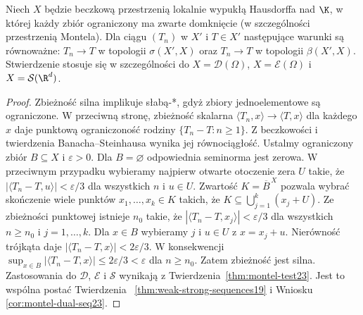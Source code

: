 \begin{twierdzenie}
\label{thm:weak-strong-sequences25}
Niech $X$ będzie beczkową przestrzenią lokalnie wypukłą
Hausdorffa nad $\K$, w której każdy zbiór ograniczony
ma zwarte domknięcie (w szczególności przestrzenią Montela).
Dla ciągu $(T_n)$ w $X'$ i $T\in X'$ następujące
warunki są równoważne: $T_n\to T$ w topologii
$\sigma(X',X)$ oraz $T_n\to T$ w topologii $\beta(X',X)$.
Stwierdzenie stosuje się w szczególności do
$X=\mathcal D(\Omega)$, $X=\mathcal E(\Omega)$ i
$X=\mathcal S(\R^d)$.
\end{twierdzenie}
\begin{proof}
Zbieżność silna implikuje słabą-*, gdyż zbiory
jednoelementowe są ograniczone. W przeciwną stronę,
zbieżność skalarna $\langle T_n,x\rangle\to\langle T,x\rangle$
dla każdego $x$ daje punktową ograniczoność rodziny
$\{T_n-T:n\ge1\}$. Z beczkowości i twierdzenia
Banacha--Steinhausa wynika jej równociągłość.
Ustalmy ograniczony zbiór $B\subseteq X$ i $\varepsilon>0$.
Dla $B=\varnothing$ odpowiednia seminorma jest zerowa.
W przeciwnym przypadku wybieramy najpierw otwarte
otoczenie zera $U$ takie, że
$|\langle T_n-T,u\rangle|<\varepsilon/3$
dla wszystkich $n$ i $u\in U$.
Zwartość $K=\overline B^{\,X}$ pozwala wybrać skończenie
wiele punktów $x_1,\ldots,x_k\in K$ takich, że
$K\subseteq\bigcup_{j=1}^k(x_j+U)$.
Ze zbieżności punktowej istnieje $n_0$ takie, że
$|\langle T_n-T,x_j\rangle|<\varepsilon/3$
dla wszystkich $n\ge n_0$ i $j=1,\ldots,k$.
Dla $x\in B$ wybieramy $j$ i $u\in U$ z $x=x_j+u$.
Nierówność trójkąta daje
$|\langle T_n-T,x\rangle|<2\varepsilon/3$.
W konsekwencji
$\sup_{x\in B}|\langle T_n-T,x\rangle|\le2\varepsilon/3<\varepsilon$
dla $n\ge n_0$.
Zatem zbieżność jest silna. Zastosowania do $\mathcal D$,
$\mathcal E$ i $\mathcal S$ wynikają z
Twierdzenia~\ref{thm:montel-test23}.
Jest to wspólna postać Twierdzenia~
\ref{thm:weak-strong-sequences19} i Wniosku~
\ref{cor:montel-dual-seq23}.
\end{proof}

